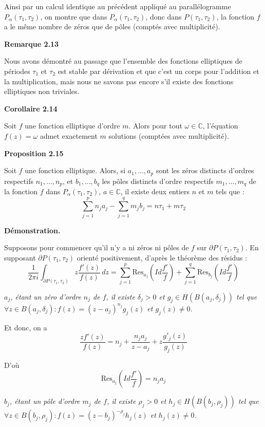 \documentclass{article}
\begin{document}
Ainsi par un calcul identique au précédent appliqué au parallélogramme \( P_\alpha(\tau_1, \tau_2) \), on montre que dans \( P_\alpha(\tau_1, \tau_2) \), donc dans \( P(\tau_1, \tau_2) \), la fonction \( f \) a le même nombre de zéros que de pôles (comptés avec multiplicité).

\textbf{Remarque 2.13}

Nous avons démontré au passage que l'ensemble des fonctions elliptiques de périodes \( \tau_1 \) et \( \tau_2 \) est stable par dérivation et que c'est un corps pour l'addition et la multiplication, mais nous ne savons pas encore s'il existe des fonctions elliptiques non triviales.

\textbf{Corollaire 2.14}

Soit \( f \) une fonction elliptique d'ordre \( m \). Alors pour tout \( \omega \in \mathbb{C} \), l'équation \( f(z) = \omega \) admet exactement \( m \) solutions (comptées avec multiplicité).

\textbf{Proposition 2.15}

Soit \( f \) une fonction elliptique. Alors, si \( a_1, \ldots, a_p \) sont les zéros distincts d'ordres respectifs \( n_1, \ldots, n_p \), et \( b_1, \ldots, b_q \) les pôles distincts d'ordre respectifs \( m_1, \ldots, m_q \) de la fonction \( f \) dans \( P_{\alpha}(\tau_1, \tau_2) \), \( a \in \mathbb{C} \), il existe deux entiers \( n \) et \( m \) tels que :
\[
\sum_{j=1}^p n_j a_j - \sum_{j=1}^q m_j b_j = n\tau_1 + m\tau_2
\]

\textbf{Démonstration.}

Supposons pour commencer qu'il n'y a ni zéros ni pôles de \( f \) sur \( \partial P(\tau_1, \tau_2) \). En supposant \( \partial P(\tau_1, \tau_2) \) orienté positivement, d'après le théorème des résidus :
\[
\frac{1}{2\pi i} \int_{\partial P(\tau_1, \tau_2)} z\frac{f'(z)}{f(z)} \, dz = \sum_{j=1}^p \text{Res}_{a_j} \left( Id\frac{f'}{f} \right) + \sum_{j=1}^q \text{Res}_{b_j} \left( Id\frac{f'}{f} \right)
\]

\textit{$a_j$, étant un zéro d'ordre $n_j$ de $f$, il existe $\delta_j > 0$ et $g_j \in H(B(a_j, \delta_j))$ tel que $  \forall z \in B(a_j, \delta_j): f(z) = (z - a_j)^{n_j} g_j(z)$ et $g_j(z) \neq 0$.}

Et donc, on a
\[
\frac{z f'(z)}{f(z)} = n_j + \frac{n_j a_j}{z - a_j} +   z  \frac{ g'_j(z)}{g_j(z)}
\]

D'où
\[
\text{Res}_{a_j} \left(  Id\frac{f'}{f} \right) = n_j a_j
\]

\textit{$b_j$, étant un pôle d'ordre $m_j$ de $f$, il existe $\rho_j > 0$ et $h_j \in H(B(b_j, \rho_j))$ tel que $ \forall z \in B(b_j, \rho_j) : f(z) = (z - b_j)^{-\rho_j} h_j(z)$ et $h_j(z) \neq 0$.}
\end{document}
